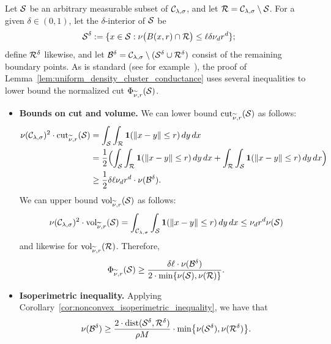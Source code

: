 	Let $\mathcal{S}$ be an arbitrary measurable subset of $\mathcal{C}_{\lambda,\sigma}$, and let $\mathcal{R} = \mathcal{C}_{\lambda,\sigma} \setminus \mathcal{S}$. For a given $\delta \in (0,1)$, let the $\delta$-interior of $\mathcal{S}$ be 
	\begin{equation*}
	\mathcal{S}^{\delta} := \{x \in \mathcal{S}: \nu\bigl(B(x,r) \cap \mathcal{R}\bigr) \leq \ell \delta \nu_d r^d\};
	\end{equation*}
	define $\mathcal{R}^{\delta}$ likewise, and let $\mathcal{B}^{\delta} = \mathcal{C}_{\lambda,\sigma} \setminus (\mathcal{S}^{\delta} \cup \mathcal{R}^{\delta})$ consist of the remaining boundary points.
	As is standard (see for example~\cite{dyer1991b,lovasz1990}), the proof of Lemma~\ref{lem:uniform_density_cluster_conductance} uses several inequalities to lower bound the normalized cut $\Phi_{\widetilde{\nu},r}(\mathcal{S})$.
	\begin{itemize}
		\item \textbf{Bounds on cut and volume.}
		We can lower bound $\mathrm{cut}_{\widetilde{\nu},r}(\mathcal{S})$ as follows:
		\begin{align*}
		\nu(\mathcal{C}_{\lambda,\sigma})^2 \cdot \mathrm{cut}_{\widetilde{\nu},r}(\mathcal{S}) & = \int_{\mathcal{S}} \int_{\mathcal{R}} \mathbf{1}(\|x - y\| \leq r) \,dy \,dx \\
		& = \frac{1}{2}\Bigl(\int_{\mathcal{S}} \int_{\mathcal{R}} \mathbf{1}(\|x - y\| \leq r) \,dy \,dx + \int_{\mathcal{R}} \int_{\mathcal{S}} \mathbf{1}(\|x - y\| \leq r) \,dy \,dx\Bigr) \\
		& \geq \frac{1}{2} \delta \ell \nu_d r^d \cdot \nu(\mathcal{B}^{\delta}).
		\end{align*}
		We can upper bound $\mathrm{vol}_{\widetilde{\nu},r}(\mathcal{S})$ as follows:
		\begin{equation*}
		\nu(\mathcal{C}_{\lambda,\sigma})^2 \cdot \mathrm{vol}_{\widetilde{\nu},r}(\mathcal{S}) = \int_{\mathcal{C}_{\lambda,\sigma}} \int_{\mathcal{S}} \mathbf{1}(\|x - y\| \leq r) \,dy \,dx \leq \nu_d r^d \nu(\mathcal{S})
		\end{equation*}
		and likewise for $\mathrm{vol}_{\widetilde{\nu},r}(\mathcal{R})$. Therefore,
		\begin{equation}
		\label{pf:uniform_density_cluster_conductance_1}
		\Phi_{\widetilde{\nu},r}(\mathcal{S}) \geq \frac{\delta \ell \cdot \nu(\mathcal{B}^{\delta})}{2 \cdot \min\{\nu(\mathcal{S}), \nu(\mathcal{R})\}}.
		\end{equation}
		\item \textbf{Isoperimetric inequality.}
		Applying Corollary~\ref{cor:nonconvex_isoperimetric_inequality}, we have that
		\begin{equation}
		\label{pf:uniform_density_cluster_conductance_2}
		\nu(\mc{B}^{\delta}) \geq \frac{2 \cdot \mathrm{dist}(\mc{S}^{\delta},\mc{R}^{\delta})}{\rho M} \cdot \min\bigl\{\nu(\mc{S}^{\delta}),\nu(\mc{R}^{\delta})\bigr\}.

\end{equation}
\end{itemize}
